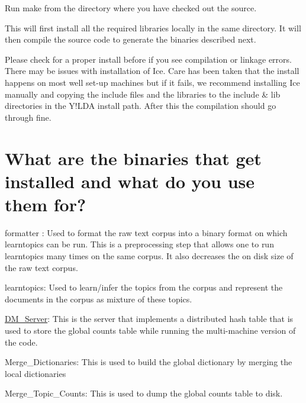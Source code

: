 \begin{DoxyEnumerate}
\item 

Run make from the directory where you have checked out the source. 
\item 

This will first install all the required libraries locally in the same directory. It will then compile the source code to generate the binaries described next. 
\item 

Please check for a proper install before if you see compilation or linkage errors. There may be issues with installation of Ice. Care has been taken that the install happens on most well set-\/up machines but if it fails, we recommend installing Ice manually and copying the include files and the libraries to the include \& lib directories in the Y!LDA install path. After this the compilation should go through fine. 
\end{DoxyEnumerate}

\par
  \section*{What are the binaries that get installed and what do you use them for?}


\begin{DoxyEnumerate}
\item 

formatter : Used to format the raw text corpus into a binary format on which learntopics can be run. This is a preprocessing step that allows one to run learntopics many times on the same corpus. It also decreases the on disk size of the raw text corpus. 
\item 

learntopics: Used to learn/infer the topics from the corpus and represent the documents in the corpus as mixture of these topics. 
\item 

\hyperlink{class_d_m___server}{DM\_\-Server}: This is the server that implements a distributed hash table that is used to store the global counts table while running the multi-\/machine version of the code. 
\item 

Merge\_\-Dictionaries: This is used to build the global dictionary by merging the local dictionaries 
\item 

Merge\_\-Topic\_\-Counts: This is used to dump the global counts table to disk. 
\end{DoxyEnumerate}

